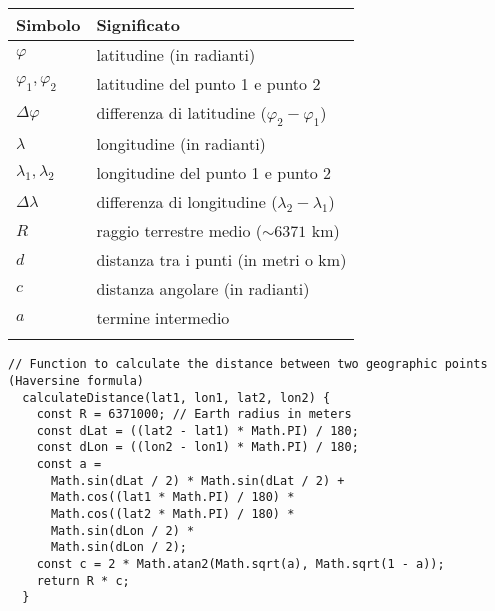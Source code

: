 \begin{tabular}{ll}
  \textbf{Simbolo}       & \textbf{Significato}                                \\
  \hline
  $\varphi$              & latitudine (in radianti)                            \\
  $\varphi_1, \varphi_2$ & latitudine del punto 1 e punto 2                    \\
  $\Delta\varphi$        & differenza di latitudine ($\varphi_2 - \varphi_1$)  \\
  $\lambda$              & longitudine (in radianti)                           \\
  $\lambda_1, \lambda_2$ & longitudine del punto 1 e punto 2                   \\
  $\Delta\lambda$        & differenza di longitudine ($\lambda_2 - \lambda_1$) \\
  $R$                    & raggio terrestre medio ($\sim 6371$ km)             \\
  $d$                    & distanza tra i punti (in metri o km)                \\
  $c$                    & distanza angolare (in radianti)                     \\
  $a$                    & termine intermedio                                  \\
  \label{lst:haversine-formula-math-legend}
\end{tabular}

\begin{lstlisting}[caption={Formual di Haversine in codice Javascript}, label=lst:haversine-formula-code]
  // Function to calculate the distance between two geographic points (Haversine formula)
  calculateDistance(lat1, lon1, lat2, lon2) {
    const R = 6371000; // Earth radius in meters
    const dLat = ((lat2 - lat1) * Math.PI) / 180;
    const dLon = ((lon2 - lon1) * Math.PI) / 180;
    const a =
      Math.sin(dLat / 2) * Math.sin(dLat / 2) +
      Math.cos((lat1 * Math.PI) / 180) *
      Math.cos((lat2 * Math.PI) / 180) *
      Math.sin(dLon / 2) *
      Math.sin(dLon / 2);
    const c = 2 * Math.atan2(Math.sqrt(a), Math.sqrt(1 - a));
    return R * c;
  }
\end{lstlisting}